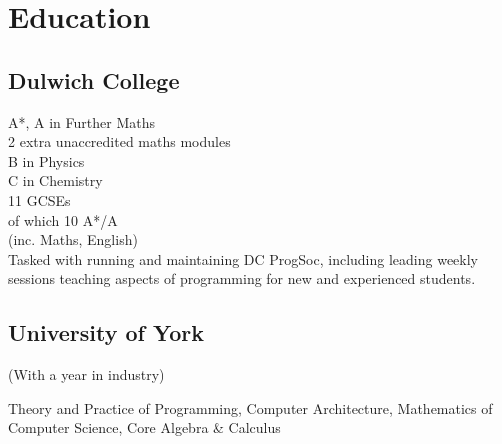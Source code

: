 \documentclass[a4paper]{cv}
\begin{document}
	\begin{minipage}[t]{0.8\textwidth}\centering
		
		
		\section{Education}
		
		\begin{minipage}[t]{0.4\textwidth}
			\subsection{Dulwich College}
			
			A*, A in Further Maths \\
			2 extra unaccredited maths modules \\
			B in Physics \\
			C in Chemistry \\\vspace{4pt}
			11 GCSEs \\
			of which 10 A*/A \\
			(inc. Maths, English)\\\vspace{4pt}
			Tasked with running and maintaining DC ProgSoc, including leading weekly sessions teaching aspects of programming for new and experienced students.
			
		\end{minipage}
		\begin{minipage}[t]{0.55\textwidth}
			\subsection{University of York}
			
			(With a year in industry) \\\vspace{4pt}
			
			Theory and Practice of Programming,
			Computer Architecture,
			Mathematics of Computer Science,
			Core Algebra \& Calculus \\\vspace{4pt}
			

\end{minipage}
\end{minipage}
\end{document}
